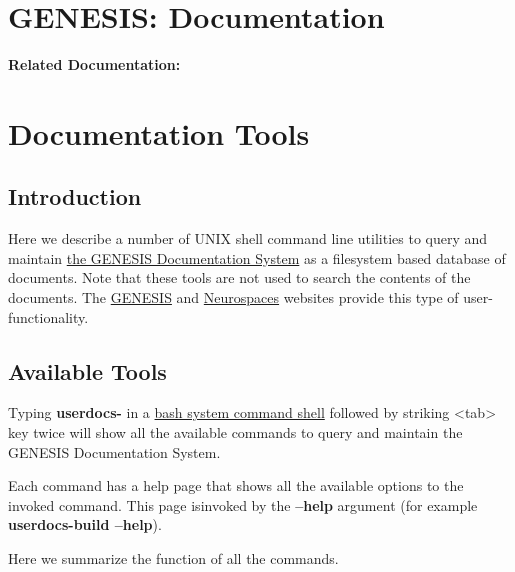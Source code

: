 \documentclass[12pt]{article}
\begin{document}
\section*{GENESIS: Documentation}

{\bf Related Documentation:}

\section*{Documentation Tools}

\subsection*{Introduction}

Here we describe a number of UNIX shell command line utilities to
query and maintain
\href{../documentation-overview/documentation-overview.tex}{the
  GENESIS Documentation System} as a filesystem based database of
documents.  Note that these tools are not used to search the contents
of the documents.  The \href{http://www.genesis-sim.org/}{GENESIS} and
\href{http://www.neurospaces.org/}{Neurospaces} websites provide this
type of user-functionality.


\subsection*{Available Tools}

Typing {\bf userdocs-} in a
\href{http://www.gnu.org/software/bash/}{bash system command shell}
followed by striking <tab> key twice will show all the available
commands to query and maintain the GENESIS Documentation System.

Each command has a help page that shows all the available options to
the invoked command.  This page isinvoked by the {\bf --help} argument
(for example {\bf userdocs-build --help}).

Here we summarize the function of all the commands.
\end{document}
